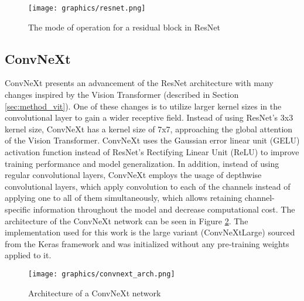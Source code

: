 \documentclass[draft,final]{vutinfth} %
\begin{document}
\begin{figure}[h]
    \centering
    \texttt{[image: graphics/resnet.png]}
    \caption{The mode of operation for a residual block in ResNet \cite{ruiz_understanding_2018, he_deep_2015}}
    \label{fig:resnet_block}
\end{figure}

\subsection{ConvNeXt} \label{sec:arch_convnext}
ConvNeXt presents an advancement of the ResNet architecture with many changes inspired by the Vision Transformer (described in Section \ref{sec:method_vit}). One of these changes is to utilize larger kernel sizes in the convolutional layer to gain a wider receptive field. Instead of using ResNet's 3x3 kernel size, ConvNeXt has a kernel size of 7x7, approaching the global attention of the Vision Transformer. ConvNeXt uses the Gaussian error linear unit (GELU) activation function instead of ResNet's Rectifying Linear Unit (ReLU) to improve training performance and model generalization. In addition, instead of using regular convolutional layers, ConvNeXt employs the usage of depthwise convolutional layers, which apply convolution to each of the channels instead of applying one to all of them simultaneously, which allows retaining channel-specific information throughout the model \cite{pandey_depth-wise_2018, singh_convnext_2022} and decrease computational cost.
The architecture of the ConvNeXt network can be seen in Figure \ref{fig:arch_convnext}.
The implementation used for this work is the large variant (ConvNeXtLarge) sourced from the Keras framework \cite{chollet_keras_2015} and was initialized without any pre-training weights applied to it.

\begin{figure}
    \centering
    \texttt{[image: graphics/convnext\_arch.png]}
    \caption{Architecture of a ConvNeXt network \cite{chen_large-scale_2023}}
    \label{fig:arch_convnext}
\end{figure}
\end{document}
